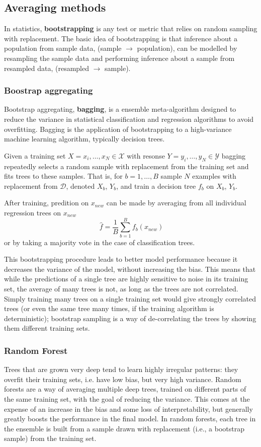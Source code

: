 \documentclass[11pt]{article}
\theoremstyle{plain}
\theoremstyle{definition}
\begin{document}
\subsection{Averaging methods}
In statistics, \textbf{bootstrapping} is any test or metric that relies on random sampling with replacement. The basic idea of bootstrapping is that inference about a population from sample data, (sample $\rightarrow$ population), can be modelled by resampling the sample data and performing inference about a sample from resampled data, (resampled $\rightarrow$ sample).

\subsubsection{Boostrap aggregating}
Bootstrap aggregating, \textbf{bagging}, is a ensemble meta-algorithm designed to reduce the variance in statistical classification and regression algorithms to avoid overfitting. Bagging is the application of bootstrapping to a high-variance machine learning algorithm, typically decision trees.

Given a training set $X=x_i,\dots,x_N \in \mathcal{X}$ with resonse $Y=y_i,\dots,y_N \in \mathcal{Y}$ bagging repeatedly selects a random sample with replacement from the training set and fits trees to these samples. That is, for $b = 1, \dots, B$ sample $N$ examples with replacement from $\mathcal{D}$, denoted $X_b$, $Y_b$, and train a decision tree $f_b$ on $X_b$, $Y_b$.

After training, predition on $x_{new}$ can be made by averaging from all individual regression trees on $x_{new}$
\begin{equation}\
\hat{f} = \frac{1}{B} \sum_{b=1}^B f_b(x_{new})
\end{equation}
or by taking a majority vote in the case of classification trees.

This bootstrapping procedure leads to better model performance because it decreases the variance of the model, without increasing the bias. This means that while the predictions of a single tree are highly sensitive to noise in its training set, the average of many trees is not, as long as the trees are not correlated. Simply training many trees on a single training set would give strongly correlated trees (or even the same tree many times, if the training algorithm is deterministic); bootstrap sampling is a way of de-correlating the trees by showing them different training sets.


\subsubsection{Random Forest}
Trees that are grown very deep tend to learn highly irregular patterns: they overfit their training sets, i.e. have low bias, but very high variance. Random forests are a way of averaging multiple deep trees, trained on different parts of the same training set, with the goal of reducing the variance. This comes at the expense of an increase in the bias and some loss of interpretability, but generally greatly boosts the performance in the final model. In random forests, each tree in the ensemble is built from a sample drawn with replacement (i.e., a bootstrap sample) from the training set. 
\end{document}
